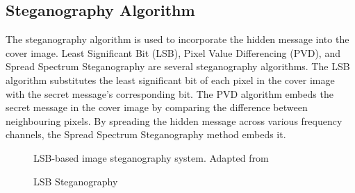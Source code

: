  \subsection{Steganography Algorithm}
 The steganography algorithm is used to incorporate the hidden message into the cover image. Least Significant Bit (LSB), Pixel Value Differencing (PVD), and Spread Spectrum Steganography are several steganography algorithms. The LSB algorithm substitutes the least significant bit of each pixel in the cover image with the secret message's corresponding bit. The PVD algorithm embeds the secret message in the cover image by comparing the difference between neighbouring pixels. By spreading the hidden message across various frequency channels, the Spread Spectrum Steganography method embeds it.

\begin{figure}[ht!]
\centering
{}
\caption{LSB-based image steganography system. Adapted from \cite{article}}
\end{figure}


\begin{figure}[ht!]
\centering
     \caption{LSB Steganography \cite{link}}
\end{figure}


